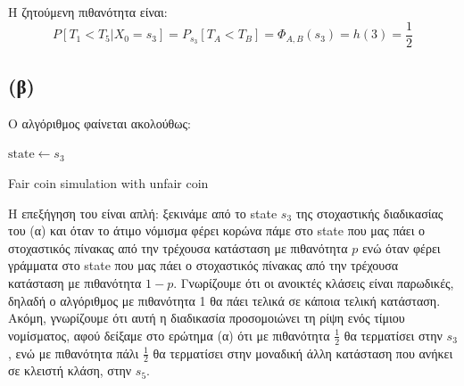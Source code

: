 \documentclass[a4paper,oneside, 11pt]{article}
\begin{document}
Η ζητούμενη πιθανότητα είναι:
$$
P[T_1 < T_5 | X_0 = s_3] = P_{s_3}[T_A < T_B] = \Phi_{A, B}(s_3) = h(3) = \frac{1}{2}
$$

\subsection*{(β)}

Ο αλγόριθμος φαίνεται ακολούθως:

\begin{algorithm}[H]
	\SetAlgoLined
	$\textrm{state} \gets s_3$\;
	{
	}
	\caption{Fair coin simulation with unfair coin}
\end{algorithm}

Η επεξήγηση του είναι απλή: ξεκινάμε από το state $s_3$ της στοχαστικής διαδικασίας του (α) και όταν το άτιμο νόμισμα φέρει κορώνα πάμε στο state που μας πάει ο στοχαστικός πίνακας από την τρέχουσα κατάσταση με πιθανότητα $p$ ενώ όταν φέρει γράμματα στο state που μας πάει ο στοχαστικός πίνακας από την τρέχουσα κατάσταση με πιθανότητα $1-p$. Γνωρίζουμε ότι οι ανοικτές κλάσεις είναι παρωδικές, δηλαδή ο αλγόριθμος με πιθανότητα 1 θα πάει τελικά σε κάποια τελική κατάσταση. Ακόμη, γνωρίζουμε ότι αυτή η διαδικασία προσομοιώνει τη ρίψη ενός τίμιου νομίσματος, αφού δείξαμε στο ερώτημα (α) ότι με πιθανότητα $\frac{1}{2}$ θα τερματίσει στην $s_3$, ενώ με πιθανότητα πάλι $\frac{1}{2}$ θα τερματίσει στην μοναδική άλλη κατάσταση που ανήκει σε κλειστή κλάση, στην $s_5$.
\end{document}
